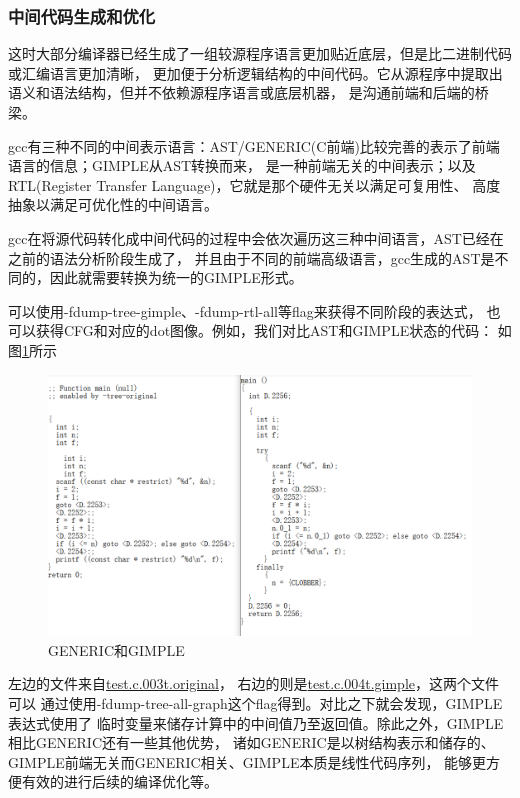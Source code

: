 \documentclass[UTF8,a4paper,10pt]{ctexart}
\begin{document}
\subsubsection{中间代码生成和优化}
这时大部分编译器已经生成了一组较源程序语言更加贴近底层，但是比二进制代码或汇编语言更加清晰，
更加便于分析逻辑结构的中间代码。它从源程序中提取出语义和语法结构，但并不依赖源程序语言或底层机器，
是沟通前端和后端的桥梁。
\par
gcc有三种不同的中间表示语言：AST/GENERIC(C前端)比较完善的表示了前端语言的信息；GIMPLE从AST转换而来，
是一种前端无关的中间表示；以及RTL(Register Transfer Language)，它就是那个硬件无关以满足可复用性、
高度抽象以满足可优化性的中间语言。
\par
gcc在将源代码转化成中间代码的过程中会依次遍历这三种中间语言，AST已经在之前的语法分析阶段生成了，
并且由于不同的前端高级语言，gcc生成的AST是不同的，因此就需要转换为统一的GIMPLE形式。
\par
可以使用-fdump-tree-gimple、-fdump-rtl-all等flag来获得不同阶段的表达式，
也可以获得CFG和对应的dot图像。例如，我们对比AST和GIMPLE状态的代码：
如图\ref{fig:1}所示
\begin{figure}[H]
  \centering
  \includegraphics[scale=0.5]{generic_vs_gimple.png}
  \caption{GENERIC和GIMPLE}
  \label{fig:1}
\end{figure}
左边的文件来自\href{run:./test/all/test.c.003t.original}{test.c.003t.original}，
右边的则是\href{run:./test/all/test.c.004t.gimple}{test.c.004t.gimple}，这两个文件可以
通过使用-fdump-tree-all-graph这个flag得到。对比之下就会发现，GIMPLE表达式使用了
临时变量来储存计算中的中间值乃至返回值。除此之外，GIMPLE相比GENERIC还有一些其他优势，
诸如GENERIC是以树结构表示和储存的、GIMPLE前端无关而GENERIC相关、GIMPLE本质是线性代码序列，
能够更方便有效的进行后续的编译优化等。
\par
\end{document}
